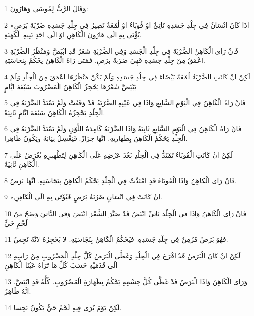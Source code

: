 \par 1 وَقَالَ الرَّبُّ لِمُوسَى وَهَارُونَ:
\par 2 «اذَا كَانَ انْسَانٌ فِي جِلْدِ جَسَدِهِ نَاتِئٌ اوْ قُوبَاءُ اوْ لُمْعَةٌ تَصِيرُ فِي جِلْدِ جَسَدِهِ ضَرْبَةَ بَرَصٍ يُؤْتَى بِهِ الَى هَارُونَ الْكَاهِنِ اوْ الَى احَدِ بَنِيهِ الْكَهَنَةِ.
\par 3 فَانْ رَاى الْكَاهِنُ الضَّرْبَةَ فِي جِلْدِ الْجَسَدِ وَفِي الضَّرْبَةِ شَعَرٌ قَدِ ابْيَضَّ وَمَنْظَرُ الضَّرْبَةِ اعْمَقُ مِنْ جِلْدِ جَسَدِهِ فَهِيَ ضَرْبَةُ بَرَصٍ. فَمَتَى رَاهُ الْكَاهِنُ يَحْكُمُ بِنَجَاسَتِهِ.
\par 4 لَكِنْ انْ كَانَتِ الضَّرْبَةُ لُمْعَةً بَيْضَاءَ فِي جِلْدِ جَسَدِهِ وَلَمْ يَكُنْ مَنْظَرُهَا اعْمَقَ مِنَ الْجِلْدِ وَلَمْ يَبْيَضَّ شَعْرُهَا يَحْجِزُ الْكَاهِنُ الْمَضْرُوبَ سَبْعَةَ ايَّامٍ.
\par 5 فَانْ رَاهُ الْكَاهِنُ فِي الْيَوْمِ السَّابِعِ وَاذَا فِي عَيْنِهِ الضَّرْبَةُ قَدْ وَقَفَتْ وَلَمْ تَمْتَدَّ الضَّرْبَةُ فِي الْجِلْدِ يَحْجِزُهُ الْكَاهِنُ سَبْعَةَ ايَّامٍ ثَانِيَةً.
\par 6 فَانْ رَاهُ الْكَاهِنُ فِي الْيَوْمِ السَّابِعِ ثَانِيَةً وَاذَا الضَّرْبَةُ كَامِدَةُ اللَّوْنِ وَلَمْ تَمْتَدَّ الضَّرْبَةُ فِي الْجِلْدِ يَحْكُمُ الْكَاهِنُ بِطَهَارَتِهِ. انَّهَا حِزَازٌ. فَيَغْسِلُ ثِيَابَهُ وَيَكُونُ طَاهِرا.
\par 7 لَكِنْ انْ كَانَتِ الْقُوبَاءُ تَمْتَدُّ فِي الْجِلْدِ بَعْدَ عَرْضِهِ عَلَى الْكَاهِنِ لِتَطْهِيرِهِ يُعْرَضُ عَلَى الْكَاهِنِ ثَانِيَةً.
\par 8 فَانْ رَاى الْكَاهِنُ وَاذَا الْقُوبَاءُ قَدِ امْتَدَّتْ فِي الْجِلْدِ يَحْكُمُ الْكَاهِنُ بِنَجَاسَتِهِ. انَّهَا بَرَصٌ.
\par 9 «انْ كَانَتْ فِي انْسَانٍ ضَرْبَةُ بَرَصٍ فَيُؤْتَى بِهِ الَى الْكَاهِنِ.
\par 10 فَانْ رَاى الْكَاهِنُ وَاذَا فِي الْجِلْدِ نَاتِئٌ ابْيَضُ قَدْ صَيَّرَ الشَّعْرَ ابْيَضَ وَفِي النَّاتِئِ وَضَحٌ مِنْ لَحْمٍ حَيٍّ
\par 11 فَهُوَ بَرَصٌ مُزْمِنٌ فِي جِلْدِ جَسَدِهِ. فَيَحْكُمُ الْكَاهِنُ بِنَجَاسَتِهِ. لا يَحْجِزُهُ لانَّهُ نَجِسٌ.
\par 12 لَكِنْ انْ كَانَ الْبَرَصُ قَدْ افْرَخَ فِي الْجِلْدِ وَغَطَّى الْبَرَصُ كُلَّ جِلْدِ الْمَضْرُوبِ مِنْ رَاسِهِ الَى قَدَمَيْهِ حَسَبَ كُلِّ مَا تَرَاهُ عَيْنَا الْكَاهِنِ
\par 13 وَرَاى الْكَاهِنُ وَاذَا الْبَرَصُ قَدْ غَطَّى كُلَّ جِسْمِهِ يَحْكُمُ بِطَهَارَةِ الْمَضْرُوبِ. كُلُّهُ قَدِ ابْيَضَّ. انَّهُ طَاهِرٌ.
\par 14 لَكِنْ يَوْمَ يُرَى فِيهِ لَحْمٌ حَيٌّ يَكُونُ نَجِسا.
